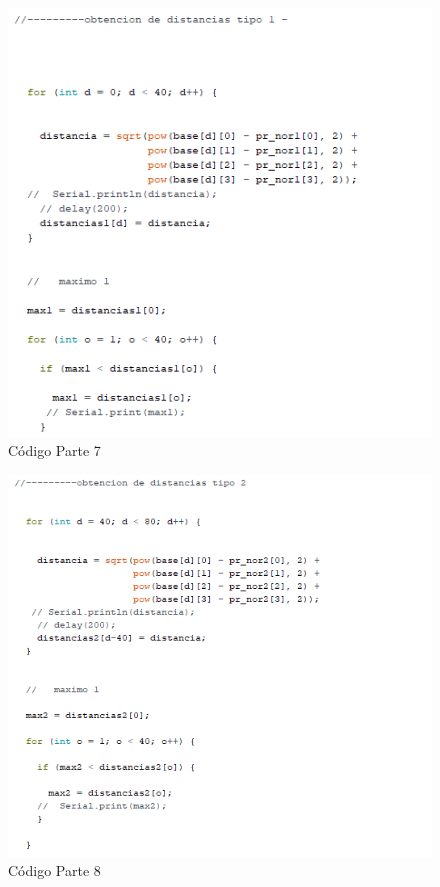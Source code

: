 \documentclass[10pt,a4paper]{article}
\begin{document}
\begin{figure}[H]
\caption{Código Parte 7}
\centering
\includegraphics[scale=0.9]{c7.png}
\end{figure}

\begin{figure}[H]
\caption{Código Parte 8}
\centering
\includegraphics[scale=0.9]{c8.png}
\end{figure}
\end{document}
